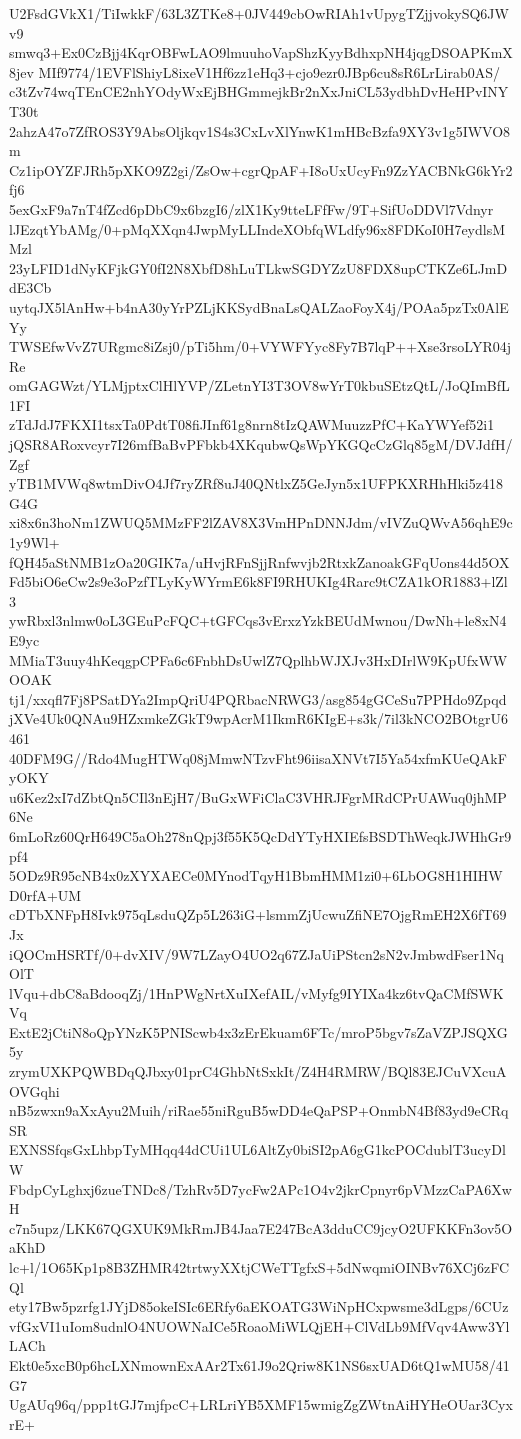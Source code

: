 U2FsdGVkX1/TiIwkkF/63L3ZTKe8+0JV449cbOwRIAh1vUpygTZjjvokySQ6JWv9
smwq3+Ex0CzBjj4KqrOBFwLAO9lmuuhoVapShzKyyBdhxpNH4jqgDSOAPKmX8jev
MIf9774/1EVFlShiyL8ixeV1Hf6zz1eHq3+cjo9ezr0JBp6cu8sR6LrLirab0AS/
c3tZv74wqTEnCE2nhYOdyWxEjBHGmmejkBr2nXxJniCL53ydbhDvHeHPvINYT30t
2ahzA47o7ZfROS3Y9AbsOljkqv1S4s3CxLvXlYnwK1mHBcBzfa9XY3v1g5IWVO8m
Cz1ipOYZFJRh5pXKO9Z2gi/ZsOw+cgrQpAF+I8oUxUcyFn9ZzYACBNkG6kYr2fj6
5exGxF9a7nT4fZcd6pDbC9x6bzgI6/zlX1Ky9tteLFfFw/9T+SifUoDDVl7Vdnyr
lJEzqtYbAMg/0+pMqXXqn4JwpMyLLIndeXObfqWLdfy96x8FDKoI0H7eydlsMMzl
23yLFID1dNyKFjkGY0fI2N8XbfD8hLuTLkwSGDYZzU8FDX8upCTKZe6LJmDdE3Cb
uytqJX5lAnHw+b4nA30yYrPZLjKKSydBnaLsQALZaoFoyX4j/POAa5pzTx0AlEYy
TWSEfwVvZ7URgmc8iZsj0/pTi5hm/0+VYWFYyc8Fy7B7lqP++Xse3rsoLYR04jRe
omGAGWzt/YLMjptxClHlYVP/ZLetnYI3T3OV8wYrT0kbuSEtzQtL/JoQImBfL1FI
zTdJdJ7FKXI1tsxTa0PdtT08fiJInf61g8nrn8tIzQAWMuuzzPfC+KaYWYef52i1
jQSR8ARoxvcyr7I26mfBaBvPFbkb4XKqubwQsWpYKGQcCzGlq85gM/DVJdfH/Zgf
yTB1MVWq8wtmDivO4Jf7ryZRf8uJ40QNtlxZ5GeJyn5x1UFPKXRHhHki5z418G4G
xi8x6n3hoNm1ZWUQ5MMzFF2lZAV8X3VmHPnDNNJdm/vIVZuQWvA56qhE9c1y9Wl+
fQH45aStNMB1zOa20GIK7a/uHvjRFnSjjRnfwvjb2RtxkZanoakGFqUons44d5OX
Fd5biO6eCw2s9e3oPzfTLyKyWYrmE6k8FI9RHUKIg4Rarc9tCZA1kOR1883+lZl3
ywRbxl3nlmw0oL3GEuPcFQC+tGFCqs3vErxzYzkBEUdMwnou/DwNh+le8xN4E9yc
MMiaT3uuy4hKeqgpCPFa6c6FnbhDsUwlZ7QplhbWJXJv3HxDIrlW9KpUfxWWOOAK
tj1/xxqfl7Fj8PSatDYa2ImpQriU4PQRbacNRWG3/asg854gGCeSu7PPHdo9Zpqd
jXVe4Uk0QNAu9HZxmkeZGkT9wpAcrM1IkmR6KIgE+s3k/7il3kNCO2BOtgrU6461
40DFM9G//Rdo4MugHTWq08jMmwNTzvFht96iisaXNVt7I5Ya54xfmKUeQAkFyOKY
u6Kez2xI7dZbtQn5CIl3nEjH7/BuGxWFiClaC3VHRJFgrMRdCPrUAWuq0jhMP6Ne
6mLoRz60QrH649C5aOh278nQpj3f55K5QcDdYTyHXIEfsBSDThWeqkJWHhGr9pf4
5ODz9R95cNB4x0zXYXAECe0MYnodTqyH1BbmHMM1zi0+6LbOG8H1HIHWD0rfA+UM
cDTbXNFpH8Ivk975qLsduQZp5L263iG+lsmmZjUcwuZfiNE7OjgRmEH2X6fT69Jx
iQOCmHSRTf/0+dvXIV/9W7LZayO4UO2q67ZJaUiPStcn2sN2vJmbwdFser1NqOlT
lVqu+dbC8aBdooqZj/1HnPWgNrtXuIXefAIL/vMyfg9IYIXa4kz6tvQaCMfSWKVq
ExtE2jCtiN8oQpYNzK5PNIScwb4x3zErEkuam6FTc/mroP5bgv7sZaVZPJSQXG5y
zrymUXKPQWBDqQJbxy01prC4GhbNtSxkIt/Z4H4RMRW/BQl83EJCuVXcuAOVGqhi
nB5zwxn9aXxAyu2Muih/riRae55niRguB5wDD4eQaPSP+OnmbN4Bf83yd9eCRqSR
EXNSSfqsGxLhbpTyMHqq44dCUi1UL6AltZy0biSI2pA6gG1kcPOCdublT3ucyDlW
FbdpCyLghxj6zueTNDc8/TzhRv5D7ycFw2APc1O4v2jkrCpnyr6pVMzzCaPA6XwH
c7n5upz/LKK67QGXUK9MkRmJB4Jaa7E247BcA3dduCC9jcyO2UFKKFn3ov5OaKhD
lc+l/1O65Kp1p8B3ZHMR42trtwyXXtjCWeTTgfxS+5dNwqmiOINBv76XCj6zFCQl
ety17Bw5pzrfg1JYjD85okeISIc6ERfy6aEKOATG3WiNpHCxpwsme3dLgps/6CUz
vfGxVI1uIom8udnlO4NUOWNaICe5RoaoMiWLQjEH+ClVdLb9MfVqv4Aww3YlLACh
Ekt0e5xcB0p6hcLXNmownExAAr2Tx61J9o2Qriw8K1NS6sxUAD6tQ1wMU58/41G7
UgAUq96q/ppp1tGJ7mjfpcC+LRLriYB5XMF15wmigZgZWtnAiHYHeOUar3CyxrE+
